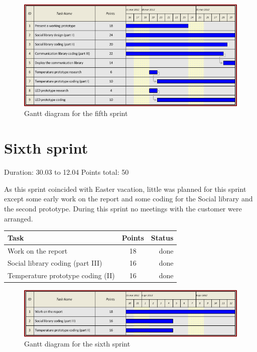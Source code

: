 \begin{figure}[h!]
\centering \includegraphics[scale=0.8]{img/sprints-gantt5.png}
\caption{Gantt diagram for the fifth sprint}
\label{fig:sprints-gantt5}
\end{figure}


\newpage

\section{Sixth sprint}

Duration: 30.03 to 12.04
Points total: 50

As this sprint coincided with Easter vacation, little
was planned for this sprint except some early work on the report
and some coding for the Social library and the second prototype.
During this sprint no meetings with the customer were arranged.

\begin{table}[ht!]
\begin{tabular}{ | l | c | r | }

\hline
\textbf{Task} & \textbf{Points} & \textbf{Status} \\
\hline

Work on the report			& 18 & done \\
\hline
Social library coding (part III)	& 16 & done \\
\hline
Temperature prototype coding (II)	& 16 & done \\
\hline

\end{tabular}
\end{table}

\begin{figure}[h!]
\centering \includegraphics[scale=0.8]{img/sprints-gantt6.png}
\caption{Gantt diagram for the sixth sprint}
\label{fig:sprints-gantt6}
\end{figure}

